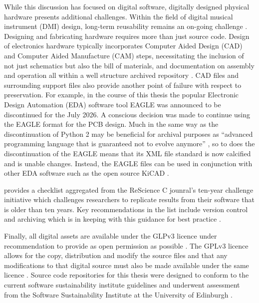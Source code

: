 While this discussion has focused on digital software, digitally designed
physical hardware presents additional challenges. Within the field of digital
musical instrument (DMI) design, long-term reusability remains an on-going
challenge \cite{fiordelmondo_towards_2025}. Designing and fabricating hardware
requires more than just source code. Design of electronics hardware typically
incorporates Computer Aided Design (CAD) and Computer Aided Manufacture (CAM)
steps, necessitating the inclusion of not just schematics but also the bill of
materials, and documentation on assembly and operation all within a  well
structure archived repository \cite{calegario_documentation_2021}. CAD files and
surrounding support files also provide another point of failure with respect to
preservation. For example, in the course of this thesis the popular Electronic
Design Automation (EDA) software tool EAGLE was announced to be discontinued
\cite{autodesk_eagle_2024} for the July 2026. A conscious decision was made to
continue using the EAGLE format for the PCB design. Much in the same way as the
discontinuation of Python 2 may be beneficial for archival purposes as
``advanced programming language that is guaranteed not to evolve anymore''
\cite{rougier_loupe_2020}, so to does the discontinuation of the EAGLE means
that its XML file standard is now calcified and is unable changes. Instead, the
EAGLE files can be used in conjunction with other EDA software such as the open
source KiCAD \cite{kicad_eagle_2024}.

\textcite{perkel_challenge_2020} provides a checklist aggregated from the
ReScience C jounral's ten-year challenge initiative which challenges researchers
to replicate results from their software that is older than ten years. Key
recommendations in the list include version control and archiving which is in
keeping with this guidance for best practice \cite{smith_software_2016,
stall_journal_2023}.

Finally, all digital assets are available under the GLPv3 licence under
recommendation to provide as open permission as possible
\cite{stall_journal_2023}. The GPLv3 licence allows for the copy, distribution
and modify the source files and that any modifications to that digital source
must also be made available under the same licence \cite{gplv3}. Source code
repositories for this thesis were designed to conform to the current software
sustainability institute guidelines and underwent assessment from the Software
Sustainability Institute at the University of Edinburgh \cite{ssi_online_2025}.


